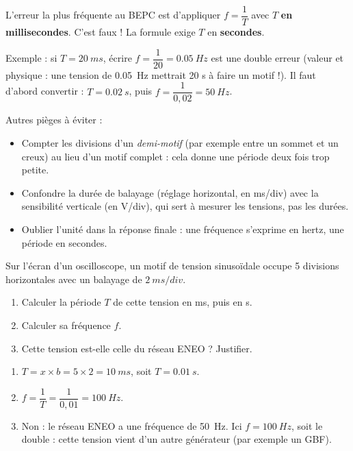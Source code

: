 \documentclass[11pt]{article}
\begin{document}
\begin{attention}
L'erreur la plus fréquente au BEPC est d'appliquer $f = \dfrac{1}{T}$ avec $T$ \textbf{en millisecondes}. C'est faux ! La formule exige $T$ en \textbf{secondes}.

Exemple : si $T = \SI{20}{ms}$, écrire $f = \dfrac{1}{20} = \SI{0,05}{Hz}$ est une double erreur (valeur et physique : une tension de \SI{0,05}{Hz} mettrait 20 s à faire un motif !). Il faut d'abord convertir : $T = \SI{0,02}{s}$, puis $f = \dfrac{1}{0,02} = \SI{50}{Hz}$.

Autres pièges à éviter :
\begin{itemize}
\item Compter les divisions d'un \emph{demi-motif} (par exemple entre un sommet et un creux) au lieu d'un motif complet : cela donne une période deux fois trop petite.
\item Confondre la durée de balayage (réglage horizontal, en ms/div) avec la sensibilité verticale (en V/div), qui sert à mesurer les tensions, pas les durées.
\item Oublier l'unité dans la réponse finale : une fréquence s'exprime en hertz, une période en secondes.
\end{itemize}
\end{attention}

\begin{exercice}
Sur l'écran d'un oscilloscope, un motif de tension sinusoïdale occupe 5 divisions horizontales avec un balayage de $\SI{2}{ms/div}$.
\begin{enumerate}
\item Calculer la période $T$ de cette tension en ms, puis en s.
\item Calculer sa fréquence $f$.
\item Cette tension est-elle celle du réseau ENEO ? Justifier.
\end{enumerate}
\end{exercice}

\begin{corrige}
\begin{enumerate}
\item $T = x \times b = 5 \times 2 = \SI{10}{ms}$, soit $T = \SI{0,01}{s}$.
\item $f = \dfrac{1}{T} = \dfrac{1}{0,01} = \SI{100}{Hz}$.
\item Non : le réseau ENEO a une fréquence de \SI{50}{Hz}. Ici $f = \SI{100}{Hz}$, soit le double : cette tension vient d'un autre générateur (par exemple un GBF).
\end{enumerate}
\end{corrige}
\end{document}
